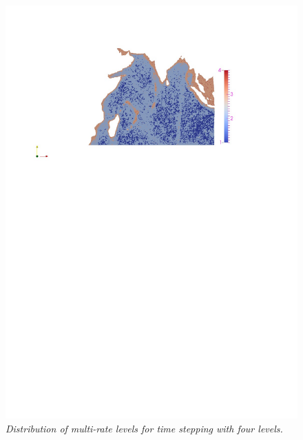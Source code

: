 


\begin{figure}[h!]
\begin{center}
\includegraphics[trim=6cm 19.65cm 4.5cm 3.1cm,clip=true,width=0.5\linewidth]{./figures/IndianOceanLevels.pdf}
\caption{\emph{Distribution of  multi-rate levels for time stepping with four levels.}}
\label{fig:indian_ocean_levels}
\end{center}
\end{figure}

